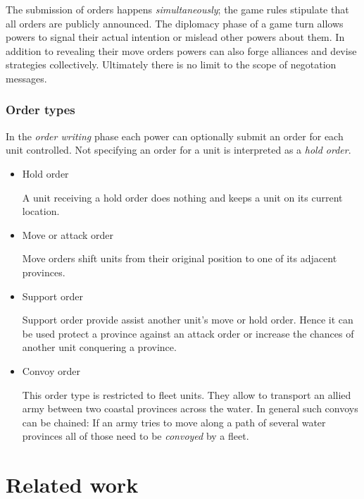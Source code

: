 \documentclass[pdftex,12pt,a4paper]{report}
\begin{document}
The submission of orders happens \textit{simultaneously}; the game
rules stipulate that all orders are publicly announced. The diplomacy
phase of a game turn allows powers to signal their actual intention or
mislead other powers about them. In addition to revealing their move
orders powers can also forge alliances and devise strategies
collectively. Ultimately there is no limit to the scope of negotation
messages.

\subsubsection{Order types}

In the \textit{order writing} phase each power can optionally submit
an order for each unit controlled. Not specifying an order for a 
unit is interpreted as a \textit{hold order}. 

\begin{itemize}

\item Hold order

A unit receiving a hold order does nothing and keeps a unit on its 
current location. 

\item Move or attack order 

Move orders shift units from their original position to one of its
adjacent provinces.

\item Support order

Support order provide assist another unit's move or hold order. Hence
it can be used protect a province against an attack order or increase
the chances of another unit conquering a province. 

\item Convoy order

This order type is restricted to fleet units. They allow to transport
an allied army between two coastal provinces across the water. In general
such convoys can be chained: If an army tries to move along a path of
several water provinces all of those need to be \textit{convoyed} 
by a fleet.

\end{itemize}



\section{Related work}
\end{document}
